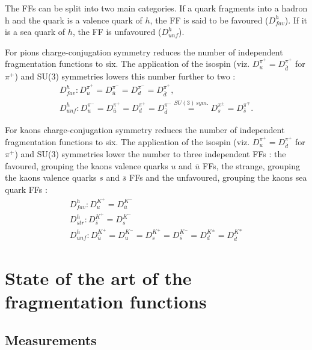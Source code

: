 The FFs can be split into two main categories. If a quark fragments into a hadron h and the quark is a valence quark of $h$, the FF is said to be favoured ($D^h_{fav}$). If it is a sea quark of $h$, the FF is unfavoured ($D^h_{unf}$).

For pions charge-conjugation symmetry reduces the number of independent fragmentation functions to six. The application of the isospin (viz. $D^{\pi^+}_u = D^{\pi^+}_{\bar{d}}$ for $\pi^+$) and SU($3$) symmetries lowers this number further to two :
%
\begin{equation}\label{eq:FFPion}
  \begin{split}
    D^h_{fav} : D^{\pi^+}_u = D^{\pi^-}_{\bar{u}} = D^{\pi^-}_d = D^{\pi^+}_{\bar{d}}, \\
    D^h_{unf} : D^{\pi^-}_u = D^{\pi^+}_{\bar{u}} = D^{\pi^+}_d = D^{\pi^-}_{\bar{d}} \stackrel{SU(3)\,sym.}{=} D^{\pi^{\pm}}_s = D^{\pi^{\mp}}_{\bar{s}}.
  \end{split}
\end{equation}

For kaons charge-conjugation symmetry reduces the number of independent fragmentation functions to six. The application of the isospin (viz. $D^{\pi^+}_u = D^{\pi^+}_{\bar{d}}$ for $\pi^+$) and SU($3$) symmetries lower the number to three independent FFs : the favoured, grouping the kaons valence quarks $u$ and $\bar{u}$ FFs, the strange, grouping the kaons valence quarks $s$ and $\bar{s}$ FFs and the unfavoured, grouping the kaons sea quark FFs :
%
\begin{equation}\label{eq:FFKaon}
  \begin{split}
    D^h_{fav} : D^{K^+}_u = D^{K^-}_{\bar{u}} \\
    D^h_{str} : D^{K^+}_{\bar{s}} = D^{K^-}_{s} \\
    D^h_{unf} : D^{K^+}_{\bar{u}} = D^{K^-}_{u} = D^{K^+}_s = D^{K^-}_{\bar{s}} = D^{K^{\pm}}_{d} = D^{K^{\mp}}_{\bar{d}}
  \end{split}
\end{equation}


\section{State of the art of the fragmentation functions}

\subsection{Measurements}

